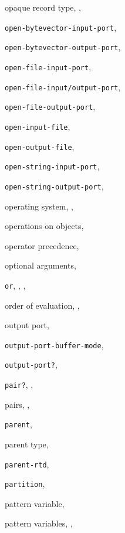 {\begin{multicols}{2}
opaque record type, \pageref{records_s15}, \pageref{records_s33}
  
\texttt{open-bytevector-input-port}, \textit{\pageref{io_s34}}
  
\texttt{open-bytevector-output-port}, \textit{\pageref{io_s36}}
  
\texttt{open-file-input-port}, \textit{\pageref{io_s29}}
  
\texttt{open-file-input/output-port}, \textit{\pageref{io_s31}}
  
\texttt{open-file-output-port}, \textit{\pageref{io_s30}}
  
\texttt{open-input-file}, \textit{\pageref{io_s75}}
  
\texttt{open-output-file}, \textit{\pageref{io_s76}}
  
\texttt{open-string-input-port}, \textit{\pageref{io_s35}}
  
\texttt{open-string-output-port}, \textit{\pageref{io_s37}}
  
operating system, \pageref{examples_s94}, \pageref{examples_s106}
  
operations on objects, \pageref{objects_s0}
  
operator precedence, \pageref{start_s12}
  
optional arguments, \pageref{binding_s10}
  
\texttt{or}, \pageref{start_s101}, \pageref{further_s23}, \textit{\pageref{control_s12}}
  
order of evaluation, \pageref{start_s48}, \pageref{control_s2}
  
output port, \pageref{io_s2}
  
\texttt{output-port-buffer-mode}, \textit{\pageref{io_s52}}
  
\texttt{output-port?}, \textit{\pageref{io_s44}}
  
\texttt{pair?}, \pageref{start_s118}, \textit{\pageref{objects_s16}}
  
pairs, \pageref{start_s27}, \pageref{objects_s26}
  
\texttt{parent}, \textit{\pageref{records_s16}}
  
parent type, \pageref{records_s9}
  
\texttt{parent-rtd}, \textit{\pageref{records_s16}}
  
\texttt{partition}, \textit{\pageref{objects_s56}}
  
pattern variable, \pageref{syntax_s17}
  
pattern variables, \pageref{further_s19}, \pageref{syntax_s32}
  

\end{multicols}}
